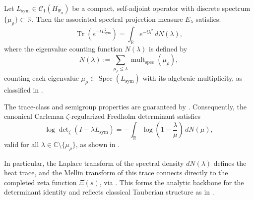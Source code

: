 \begin{lemma}
\label{lem:spectral_measure_heat_semigroup}
Let \( L_{\mathrm{sym}} \in \mathcal{C}_1(H_{\Psi_\alpha}) \) be a compact, self-adjoint operator with discrete spectrum \( \{ \mu_\rho \} \subset \mathbb{R} \). Then the associated spectral projection measure \( E_\lambda \) satisfies:
\[
\operatorname{Tr}(e^{-t L_{\mathrm{sym}}^2}) = \int_{\mathbb{R}} e^{-t\lambda^2} \, dN(\lambda),
\]
where the eigenvalue counting function \( N(\lambda) \) is defined by
\[
N(\lambda) := \sum_{\mu_\rho \leq \lambda} \operatorname{mult}_{\mathrm{spec}}(\mu_\rho),
\]
counting each eigenvalue \( \mu_\rho \in \operatorname{Spec}(L_{\mathrm{sym}}) \) with its algebraic multiplicity, as classified in .

\medskip

\noindent
The trace-class and semigroup properties are guaranteed by . Consequently, the canonical Carleman \(\zeta\)-regularized Fredholm determinant satisfies
\[
\log \det\nolimits_{\zeta}(I - \lambda L_{\mathrm{sym}})
= - \int_{\mathbb{R}} \log\left(1 - \frac{\lambda}{\mu} \right) \, dN(\mu),
\]
valid for all \( \lambda \in \mathbb{C} \setminus \{ \mu_\rho \} \), as shown in .

\medskip

\noindent
In particular, the Laplace transform of the spectral density \( dN(\lambda) \) defines the heat trace, and the Mellin transform of this trace connects directly to the completed zeta function \( \Xi(s) \), via . This forms the analytic backbone for the determinant identity and reflects classical Tauberian structure as in \cite{Korevaar2004Tauberian}.
\end{lemma}
